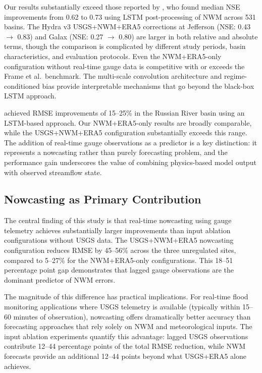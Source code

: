 \documentclass[draft]{agujournal2019}
\begin{document}
Our results substantially exceed those reported by , who found median NSE improvements from 0.62 to 0.73 using LSTM post-processing of NWM across 531 basins. The Hydra v3 USGS+NWM+ERA5 corrections at Jefferson (NSE: 0.43 $\to$ 0.83) and Galax (NSE: 0.27 $\to$ 0.80) are larger in both relative and absolute terms, though the comparison is complicated by different study periods, basin characteristics, and evaluation protocols. Even the NWM+ERA5-only configuration without real-time gauge data is competitive with or exceeds the Frame et al.\ benchmark. The multi-scale convolution architecture and regime-conditioned bias provide interpretable mechanisms that go beyond the black-box LSTM approach.

 achieved RMSE improvements of 15--25\% in the Russian River basin using an LSTM-based approach. Our NWM+ERA5-only results are broadly comparable, while the USGS+NWM+ERA5 configuration substantially exceeds this range. The addition of real-time gauge observations as a predictor is a key distinction: it represents a nowcasting rather than purely forecasting problem, and the performance gain underscores the value of combining physics-based model output with observed streamflow state.

\subsection{Nowcasting as Primary Contribution}

The central finding of this study is that real-time nowcasting using gauge telemetry achieves substantially larger improvements than input ablation configurations without USGS data. The USGS+NWM+ERA5 nowcasting configuration reduces RMSE by 45--56\% across the three unregulated sites, compared to 5--27\% for the NWM+ERA5-only configurations. This 18--51 percentage point gap demonstrates that lagged gauge observations are the dominant predictor of NWM errors.

The magnitude of this difference has practical implications. For real-time flood monitoring applications where USGS telemetry is available (typically within 15--60 minutes of observation), nowcasting offers dramatically better accuracy than forecasting approaches that rely solely on NWM and meteorological inputs. The input ablation experiments quantify this advantage: lagged USGS observations contribute 12--44 percentage points of the total RMSE reduction, while NWM forecasts provide an additional 12--44 points beyond what USGS+ERA5 alone achieves.
\end{document}
